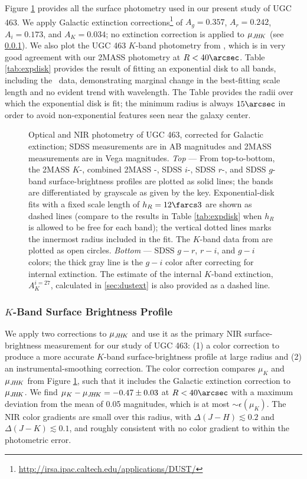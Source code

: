\documentclass[apj,iop,numberedappendix]{emulateapj}
\begin{document}
Figure \ref{fig:sbprof} provides all the surface photometry used in our present
study of UGC 463.  We apply Galactic extinction corrections\footnote{
%
\url{http://irsa.ipac.caltech.edu/applications/DUST/}
%
} of $A_g = 0.357$, $A_r = 0.242$, $A_i = 0.173$, and $A_K = 0.034$; no
extinction correction is applied to $\mu_{J\!H\!K}$ (see \sect \ref{sec:muk}).  We also
plot the UGC 463 $K$-band photometry from \citet{1994A&AS..106..451D}, which is
in very good agreement with our 2MASS photometry at $R < 40\arcsec$.   Table
\ref{tab:expdisk} provides the result of fitting an exponential disk to all
bands, including the \jhk\ data, demonstrating marginal change in the
best-fitting scale length and no evident trend with wavelength.  The Table
provides the radii over which the exponential disk is fit; the minimum radius is
always $15\arcsec$ in order to avoid non-exponential features seen near the
galaxy center.

\begin{figure}
\caption{
%
Optical and NIR photometry of UGC 463, corrected for Galactic extinction; SDSS
measurements are in AB magnitudes and 2MASS measurements are in Vega magnitudes.
{\it Top} --- From top-to-bottom, the 2MASS $K$-, combined 2MASS \jhk-, SDSS
$i$-, SDSS $r$-, and SDSS $g$-band surface-brightness profiles are plotted as
solid lines; the bands are differentiated by grayscale as given by the key.
Exponential-disk fits with a fixed scale length of $h_R = 12\farcs3$ are shown
as dashed lines (compare to the results in Table \ref{tab:expdisk} when $h_R$ is
allowed to be free for each band); the vertical dotted lines marks the innermost
radius included in the fit.  The $K$-band data from \citet{1994A&AS..106..451D}
are plotted as open circles.  {\it Bottom} --- SDSS $g-r$, $r-i$, and $g-i$
colors; the thick gray line is the $g-i$ color after correcting for internal
extinction.  The estimate of the internal $K$-band extinction, $A^{i=27}_K$,
calculated in \sect \ref{sec:dustext} is also provided as a dashed line.
%
}
\label{fig:sbprof}
\end{figure}

\subsubsection{$K$-Band Surface Brightness Profile}
\label{sec:muk}

We apply two corrections to $\mu_{J\!H\!K}$ and use it as the primary NIR
surface-brightness measurement for our study of UGC 463: (1) a color correction
to produce a more accurate $K$-band surface-brightness profile at large radius and
(2) an instrumental-smoothing correction.  The color correction compares $\mu_K$
and $\mu_{J\!H\!K}$ from Figure \ref{fig:sbprof}, such that it includes the Galactic
extinction correction to $\mu_{J\!H\!K}$.  We find $\mu_K - \mu_{J\!H\!K} = -0.47\pm 0.03$ at
$R<40\arcsec$ with a maximum deviation from the mean of 0.05 magnitudes, which
is at most $\sim\epsilon(\mu_K)$.  The NIR color gradients are small over this
radius, with $\Delta(J-H) \lesssim 0.2$ and $\Delta(J-K) \lesssim 0.1$, and
roughly consistent with no color gradient to within the photometric error.
\end{document}
